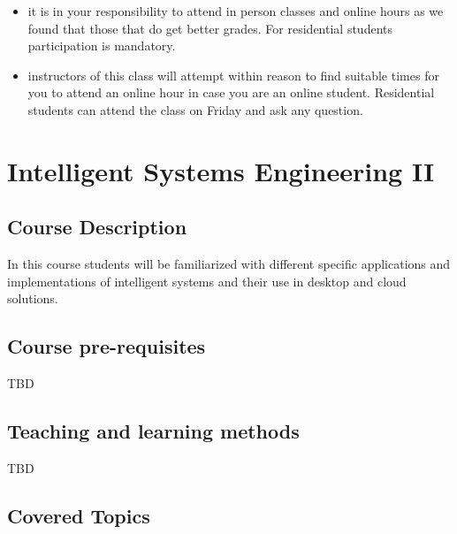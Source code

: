 \begin{itemize}
\begin{itemize}
\item it is in your responsibility to attend in person classes and
  online hours as we found that those that do get better grades. For
  residential students participation is mandatory.

\item instructors of this class will attempt within reason to find
  suitable times for you to attend an online hour in case you are an
  online student. Residential students can attend the class on Friday
  and ask any question. 

\end{itemize}

\chapter{Intelligent Systems Engineering II}


\section{Course Description}

In this course students will be familiarized with different specific
applications and implementations of intelligent systems and their use
in desktop and cloud solutions.

\section{Course pre-requisites}

TBD

\section{Teaching and learning methods}

TBD

\begin{comment}
\begin{itemize}
\item Lectures
\item Assignments including specific lab activities
\item Final project 
\end{itemize}
\end{comment}

\section{Covered Topics}


\end{itemize}
